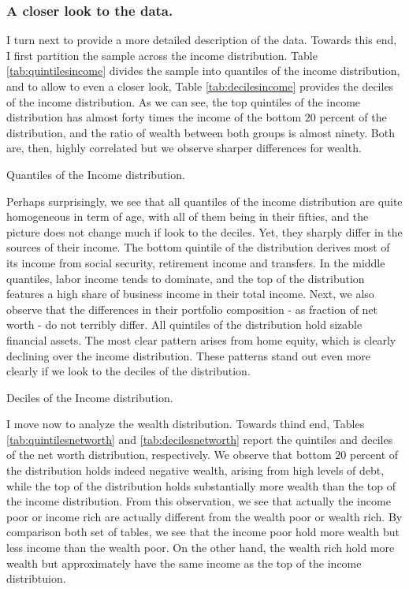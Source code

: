 \documentclass[11pt, a4paper, leqno]{article}
\begin{document}
\subsubsection*{A closer look to the data.}

I turn next to provide a more detailed description of the data. Towards this end, I first partition the sample across the income distribution. Table \ref*{tab:quintilesincome} divides the sample into quantiles of the income distribution, and to allow to even a closer look, Table \ref*{tab:decilesincome} provides the deciles of the income distribution. As we can see, the top quintiles of the income distribution has almost forty times the income of the bottom $20$ percent of the distribution, and the ratio of wealth between both groups is almost ninety. Both are, then, highly correlated but we observe sharper differences for wealth.

\begin{table}[h]
    \caption{Quantiles of the Income distribution.}
    \resizebox{\textwidth}{!}{}
    \label{tab:quintilesincome}
\end{table}

Perhaps surprisingly, we see that all quantiles of the income distribution are quite homogeneous in term of age, with all of them being in their fifties, and the picture does not change much if look to the deciles. Yet, they sharply differ in the sources of their income. The bottom quintile of the distribution derives most of its income from social security, retirement income and transfers. In the middle quantiles, labor income tends to dominate, and the top of the distribution features a high share of business income in their total income. Next, we also observe that the differences in their portfolio composition - as fraction of net worth - do not terribly differ. All quintiles of the distribution hold sizable financial assets. The most clear pattern arises from home equity, which is clearly declining over the income distribution. These patterns stand out even more clearly if we look to the deciles of the distribution. 

\begin{table}[h]
    \caption{Deciles of the Income distribution.}
    \resizebox{\textwidth}{!}{}
    \label{tab:decilesincome}
\end{table}

I move now to analyze the wealth distribution. Towards thind end, Tables \ref*{tab:quintilesnetworth} and \ref*{tab:decilesnetworth} report the quintiles and deciles of the net worth distribution, respectively. We observe that bottom $20$ percent of the distribution holds indeed negative wealth, arising from high levels of debt, while the top of the distribution holds substantially more wealth than the top of the income distribution. From this observation, we see that actually the income poor or income rich are actually different from the wealth poor or wealth rich. By comparison both set of tables, we see that the income poor hold more wealth but less income than the wealth poor. On the other hand, the wealth rich hold more wealth but approximately have the same income as the top of the income distribtuion.
\end{document}

